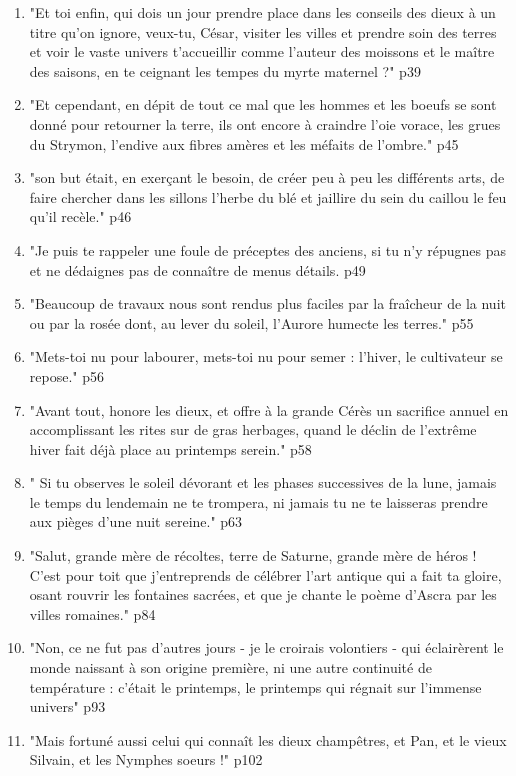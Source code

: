 \documentclass[a4paper,12pt]{book}
\newcommand{\Cit}[2]{\begin{tcolorbox}[sharp corners, colback=white,colframe=red!90!black!75, title=Citations : #1]#2\end{tcolorbox}}
\begin{document}
\Cit{Géorgiques}{
\begin{enumerate}
\item "Et toi enfin, qui dois un jour prendre place dans les conseils des dieux à un titre qu'on ignore, veux-tu, César, visiter les villes et prendre soin des terres et voir le vaste univers t'accueillir comme l'auteur des moissons et le maître des saisons, en te ceignant les tempes du myrte maternel ?" p39
\item "Et cependant, en dépit de tout ce mal que les hommes et les boeufs se sont donné pour retourner la terre, ils ont encore à craindre l'oie vorace, les grues du Strymon, l'endive aux fibres amères et les méfaits de l'ombre." p45
\item "son but était, en exerçant le besoin, de créer peu à peu les différents arts, de faire chercher dans les sillons l'herbe du blé et jaillire du sein du caillou le feu qu'il recèle." p46 
\item "Je puis te rappeler une foule de préceptes des anciens, si tu n'y répugnes pas et ne dédaignes pas de connaître de menus détails. p49
\item "Beaucoup de travaux nous sont rendus plus faciles par la fraîcheur de la nuit ou par la rosée dont, au lever du soleil, l'Aurore humecte les terres." p55
\item "Mets-toi nu pour labourer, mets-toi nu pour semer : l'hiver, le cultivateur se repose." p56
\item "Avant tout, honore les dieux, et offre à la grande Cérès un sacrifice annuel en accomplissant les rites sur de gras herbages, quand le déclin de l'extrême hiver fait déjà place au printemps serein." p58
\item " Si tu observes le soleil dévorant et les phases successives de la lune, jamais le temps du lendemain ne te trompera, ni jamais tu ne te laisseras prendre aux pièges d'une nuit sereine." p63
\item "Salut, grande mère de récoltes, terre de Saturne, grande mère de héros ! C'est pour toit que j'entreprends de célébrer l'art antique qui a fait ta gloire, osant rouvrir les fontaines sacrées, et que je chante le poème d'Ascra par les villes romaines." p84
\item "Non, ce ne fut pas d'autres jours - je le croirais volontiers - qui éclairèrent le monde naissant à son origine première, ni une autre continuité de température : c'était le printemps, le printemps qui régnait sur l'immense univers" p93
\item "Mais fortuné aussi celui qui connaît les dieux champêtres, et Pan, et le vieux Silvain, et les Nymphes soeurs !" p102

\end{enumerate}}
\end{document}
